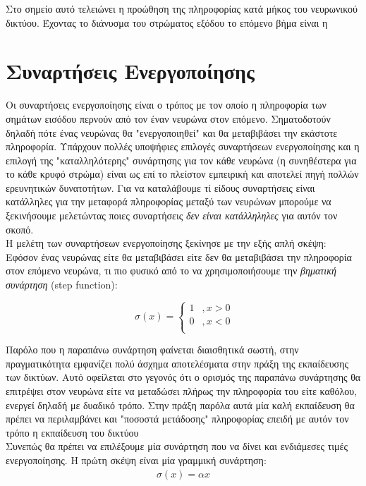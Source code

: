 \documentclass[11pt]{article} %
\numberwithin{equation}{subsection}
\begin{document}
Στο σημείο αυτό τελειώνει η προώθηση της πληροφορίας κατά μήκος του νευρωνικού δικτύου. Έχοντας το διάνυσμα του στρώματος εξόδου το επόμενο βήμα είναι η 

\section{Συναρτήσεις Ενεργοποίησης}

Οι συναρτήσεις ενεργοποίησης είναι ο τρόπος με τον οποίο η πληροφορία των σημάτων εισόδου περνούν από τον έναν νευρώνα στον επόμενο. Σηματοδοτούν δηλαδή πότε ένας νευρώνας θα "ενεργοποιηθεί" και θα μεταβιβάσει την εκάστοτε πληροφορία. Υπάρχουν πολλές υποψήφιες επιλογές συναρτήσεων ενεργοποίησης και η επιλογή της "καταλληλότερης" συνάρτησης για τον κάθε νευρώνα (η συνηθέστερα για το κάθε κρυφό στρώμα) είναι ως επί το πλείστον εμπειρική και αποτελεί πηγή πολλών ερευνητικών δυνατοτήτων. Για να καταλάβουμε τί είδους συναρτήσεις είναι κατάλληλες για την μεταφορά πληροφορίας μεταξύ των νευρώνων μπορούμε να ξεκινήσουμε μελετώντας ποιες συναρτήσεις \textit{δεν είναι κατάλληληλες} για αυτόν τον σκοπό.\\

Η μελέτη των συναρτήσεων ενεργοποίησης ξεκίνησε με την εξής απλή σκέψη: Εφόσον ένας νευρώνας είτε θα μεταβιβάσει είτε δεν θα μεταβιβάσει την πληροφορία στον επόμενο νευρώνα, τι πιο φυσικό από το να χρησιμοποιήσουμε την \textit{βηματική συνάρτηση} (step function): 

\[ 
\ \sigma(x) = \left\{
\begin{array}{ll}
      1 & , x > 0 \\
      0 & , x < 0 \\
\end{array} 
\right. 
\]

Παρόλο που η παραπάνω συνάρτηση φαίνεται διαισθητικά σωστή, στην πραγματικότητα εμφανίζει πολύ άσχημα αποτελέσματα στην πράξη της εκπαίδευσης των δικτύων. Αυτό οφείλεται στο γεγονός ότι ο ορισμός της παραπάνω συνάρτησης θα επιτρέψει στον νευρώνα είτε να μεταδώσει πλήρως την πληροφορία του είτε καθόλου, ενεργεί δηλαδή με δυαδικό τρόπο. Στην πράξη παρόλα αυτά μία καλή εκπαίδευση θα πρέπει να περιλαμβάνει και "ποσοστά μετάδοσης" πληροφορίας επειδή με αυτόν τον τρόπο η εκπαίδευση του δικτύου \\

Συνεπώς θα πρέπει να επιλέξουμε μία συνάρτηση που να δίνει και ενδιάμεσες τιμές ενεργοποίησης. Η πρώτη σκέψη είναι μία γραμμική συνάρτηση:
\begin{align*}
\sigma (x) = \alpha x
\end{align*}
\end{document}
